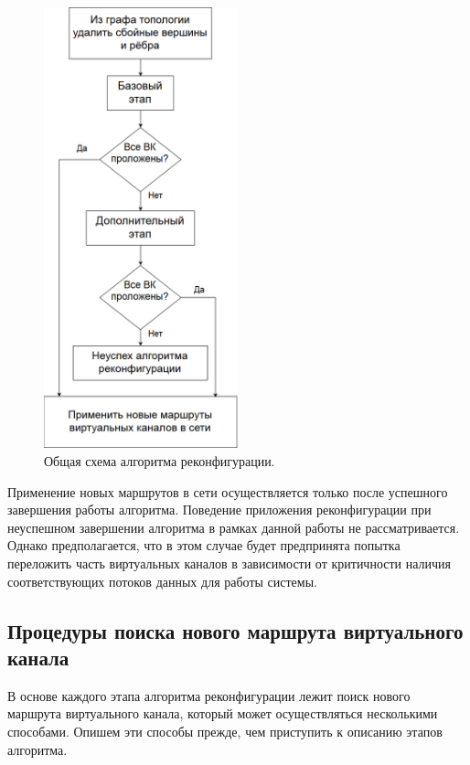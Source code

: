 \documentclass[12pt, a4paper]{article}
\begin{document}
\begin{figure}[h!]
	\centering
	\includegraphics[width=0.50\textwidth]{img/alg.png}
	\caption{Общая схема алгоритма реконфигурации.}
	\label{pic:algorithm}
\end{figure}


Применение новых маршрутов в сети осуществляется только после успешного завершения работы алгоритма. Поведение приложения реконфигурации при неуспешном завершении алгоритма в рамках данной работы не рассматривается. Однако предполагается, что в этом случае будет предпринята попытка переложить часть виртуальных каналов в зависимости от критичности наличия соответствующих потоков данных для работы системы. 

\FloatBarrier

\subsection{Процедуры поиска нового маршрута виртуального канала} \label{subsec:procalg}
В основе каждого этапа алгоритма реконфигурации лежит поиск нового маршрута виртуального канала, который может осуществляться несколькими способами. Опишем эти способы прежде, чем приступить к описанию этапов алгоритма.
\end{document}
